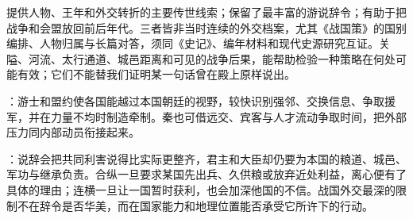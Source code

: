 \begin{sourcenote}[把说辞放回它的文本和地面]
提供人物、王年和外交转折的主要传世线索；保留了最丰富的游说辞令；有助于把战争和会盟放回前后年代。三者皆非当时连续的外交档案，尤其《战国策》的国别编排、人物归属与长篇对答，须同《史记》、编年材料和现代史源研究互证。关隘、河流、太行通道、城邑距离和可见的战争后果，能帮助检验一种策略在何处可能有效；它们不能替我们证明某一句话曾在殿上原样说出。
\end{sourcenote}

\begin{turningpoint}
：游士和盟约使各国能越过本国朝廷的视野，较快识别强邻、交换信息、争取援军，并在力量不均时制造牵制。秦也可借远交、宾客与人才流动争取时间，把外部压力同内部动员衔接起来。

：说辞会把共同利害说得比实际更整齐，君主和大臣却仍要为本国的粮道、城邑、军功与继承负责。合纵一旦要求某国先出兵、久供粮或放弃近处利益，离心便有了具体的理由；连横一旦让一国暂时获利，也会加深他国的不信。战国外交最深的限制不在辞令是否华美，而在国家能力和地理位置能否承受它所许下的行动。
\end{turningpoint}
